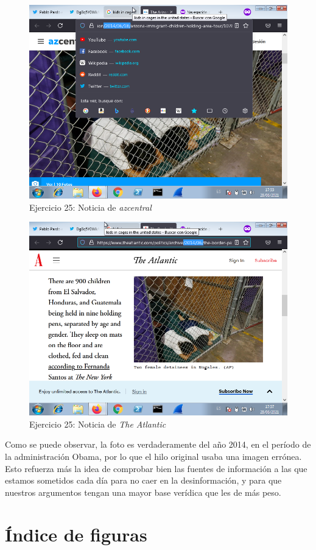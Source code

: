 \documentclass[11pt]{article}
\begin{document}
\begin{figure}[H]
    \caption{Ejercicio 25: Noticia de \textit{azcentral}}
  \centering
    \includegraphics[scale=0.8]{p05/e31-4.png}
\end{figure}

\begin{figure}[H]
    \caption{Ejercicio 25: Noticia de \textit{The Atlantic}}
  \centering
    \includegraphics[scale=0.8]{p05/e31-5.png}
\end{figure}

Como se puede observar, la foto es verdaderamente del año 2014, en el período de la administración Obama, por lo que el hilo original usaba una imagen errónea. Esto refuerza más la idea de comprobar bien las fuentes de información a las que estamos sometidos cada día para no caer en la desinformación, y para que nuestros argumentos tengan una mayor base verídica que les de más peso. 



\newpage

\section{Índice de figuras}

\listoffigures
\end{document}

